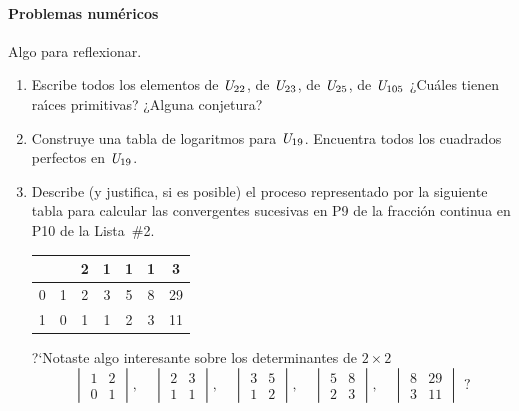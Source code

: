 \paragraph{Problemas num\'ericos}
Algo para reflexionar.
\begin{enumerate}[label=P\arabic*]
	\conti
	\item\label{item:modulares:unidades}
		Escribe todos los elementos de $\Unidadesmod[22]$,
		de $\Unidadesmod[23]$, de $\Unidadesmod[25]$,
		de $\Unidadesmod[105]$
		¿Cu\'ales tienen ra\'{\i}ces primitivas?
		¿Alguna conjetura?
	\item\label{item:modulares:logaritmos}
		Construye una tabla de logaritmos para $\Unidadesmod[19]$.
		Encuentra todos los cuadrados perfectos en $\Unidadesmod[19]$.
	\item\label{item:fracciones:procedimiento}
		Describe (y justifica, si es posible) el proceso representado
		por la siguiente tabla para calcular las convergentes sucesivas
		en P9 de la fracción continua en P10 de la Lista~\#2.
		\begin{center}
			\begin{tabular}{cc|c|c|c|c|c|}
				& & 2 & 1 & 1 & 1 & 3  \\
				\hline
				0 & 1 & 2 & 3 & 5 & 8 & 29 \\ \hline 
				1 & 0 & 1 & 1 & 2 & 3 & 11 \\
				\hline	
			\end{tabular}
		\end{center}
		?`Notaste algo interesante sobre los determinantes de $2 \times 2$
		\begin{displaymath}
			\begin{vmatrix} 1 & 2 \\ 0 & 1 \end{vmatrix}, \quad
			\begin{vmatrix} 2 & 3 \\ 1 & 1 \end{vmatrix}, \quad
			\begin{vmatrix} 3 & 5 \\ 1 & 2 \end{vmatrix}, \quad
			\begin{vmatrix} 5 & 8 \\ 2 & 3 \end{vmatrix}, \quad
			\begin{vmatrix} 8 & 29 \\ 3 & 11 \end{vmatrix}
				\text{ ?}
		\end{displaymath}

\end{enumerate}
